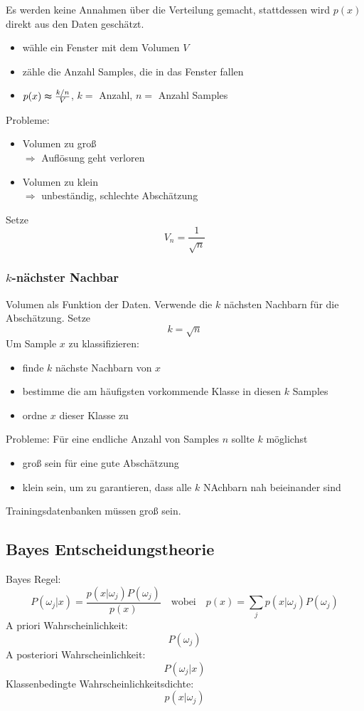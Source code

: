 Es werden keine Annahmen über die Verteilung gemacht, stattdessen wird $p(x)$ direkt aus den Daten geschätzt.
\begin{itemize}
\item wähle ein Fenster mit dem Volumen $V$
\item zähle die Anzahl Samples, die in das Fenster fallen
\item $p(x) \thickapprox \frac{k/n}{V}$, $k = $ Anzahl, $n = $ Anzahl Samples
\end{itemize}
Probleme:
\begin{itemize}
\item Volumen zu groß \\ $\Rightarrow$ Auflösung geht verloren
\item Volumen zu klein \\ $\Rightarrow$ unbeständig, schlechte Abschätzung
\end{itemize}
Setze $$V_n = \frac{1}{\sqrt{n}}$$

\subsubsection*{$k$-nächster Nachbar}

Volumen als Funktion der Daten. Verwende die $k$ nächsten Nachbarn für die Abschätzung. Setze $$k = \sqrt{n}$$ Um Sample $x$ zu klassifizieren:
\begin{itemize}
\item finde $k$ nächste Nachbarn von $x$
\item bestimme die am häufigsten vorkommende Klasse in diesen $k$ Samples
\item ordne $x$ dieser Klasse zu
\end{itemize}
Probleme: Für eine endliche Anzahl von Samples $n$ sollte $k$ möglichst
\begin{itemize}
\item groß sein für eine gute Abschätzung
\item klein sein, um zu garantieren, dass alle $k$ NAchbarn nah beieinander sind
\end{itemize}
Trainingsdatenbanken müssen groß sein.

\subsection{Bayes Entscheidungstheorie}

Bayes Regel: $$P(\omega_j | x) = \frac{p(x | \omega_j) P(\omega_j)}{p(x)} \quad \textrm{wobei} \quad p(x) = \sum\limits_{j} p(x | \omega_j) P(\omega_j)$$
A priori Wahrscheinlichkeit: $$P(\omega_j)$$
A posteriori Wahrscheinlichkeit: $$P(\omega_j | x)$$
Klassenbedingte Wahrscheinlichkeitsdichte: $$p(x | \omega_j)$$

